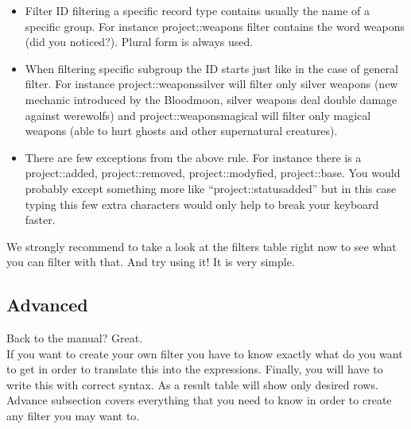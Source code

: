 \begin{itemize}
 \item Filter ID filtering a specific record type contains usually the name of a specific group. For instance project::weapons filter contains the word weapons (did you noticed?). Plural form is always used.
 \item When filtering specific subgroup the ID starts just like in the case of general filter. For instance project::weaponssilver will filter only silver weapons (new mechanic introduced by the Bloodmoon, silver weapons deal double damage against werewolfs) and project::weaponsmagical will filter only magical weapons (able to hurt ghosts and other supernatural creatures).
 \item There are few exceptions from the above rule. For instance there is a project::added, project::removed, project::modyfied, project::base. You would probably except something more like ``project::statusadded'' but in this case typing this few extra characters would only help to break your keyboard faster.
\end{itemize}

We strongly recommend to take a look at the filters table right now to see what you can filter with that. And try using it! It is very simple.

\subsection{Advanced}
Back to the manual? Great.\\
If you want to create your own filter you have to know exactly what do you want to get in order to translate this into the expressions. Finally, you will have to write this with correct syntax. As a result table will show only desired rows.\\
Advance subsection covers everything that you need to know in order to create any filter you may want to.
